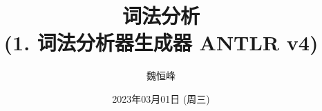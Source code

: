 \documentclass[]{beamer}
\title[词法分析]{词法分析 \\ (1. 词法分析器生成器 ANTLR v4)}
\author[魏恒峰]{\large 魏恒峰}
\institute{hfwei@nju.edu.cn}
\date{2023年03月01日 (周三)}
\begin{document}
\maketitle





\thankyou{}

\end{document}
